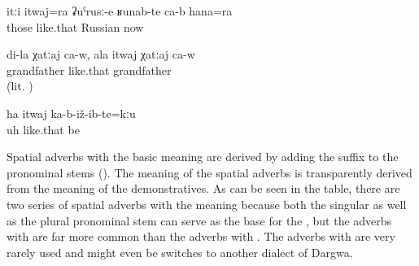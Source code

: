 \begin{exe}
	\ex	\label{ex:They are also like this, like Russians, even now}
	\gll	itːi	itwaj=ra	ʡuˁrusː-e	ʁunab-te	ca-b	hana=ra\\
		those	like.that	Russian	 		now\\
	\glt	{}

	\ex	\label{ex:(He) is my (real) grandfather. For you he is only an old man (lit. he is like a grandfather of yours)}
	\gll	di-la	χatːaj	ca-w,	ala	itwaj	χatːaj	ca-w\\
			grandfather			like.that	grandfather	\\
	\glt	{} (lit. )

	\ex	\label{ex:Uh, and so he did not marry}
	\gll	ha	itwaj	ka-b-iž-ib-te=kːu\\
		uh	like.that	be\\
	\glt	{}
\end{exe}

Spatial adverbs with the basic meaning  are derived by adding the suffix  to the pronominal stems (). The meaning of the spatial adverbs is transparently derived from the meaning of the demonstratives. As can be seen in the table, there are two series of spatial adverbs with the meaning  because both the singular as well as the plural pronominal stem can serve as the base for the , but the adverbs with  are far more common than the adverbs with . The adverbs with  are very rarely used and might even be switches to another dialect of Dargwa.

